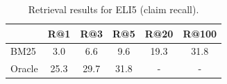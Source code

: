 \begin{table}[t]
    \centering
    \small
    \begin{tabular}{@{}lccccc@{}}
    \toprule
     & R@1 & R@3 & R@5 & R@20 & R@100 \\ \midrule
    BM25  & 3.0 & 6.6 & 9.6 & 19.3 & 31.8 \\
    Oracle & 25.3 & 29.7 & 31.8 & - & - \\
    \bottomrule
    \end{tabular}
    \caption{Retrieval results for ELI5 (claim recall).}
    \label{tab:retrieval-eli5}
\end{table}